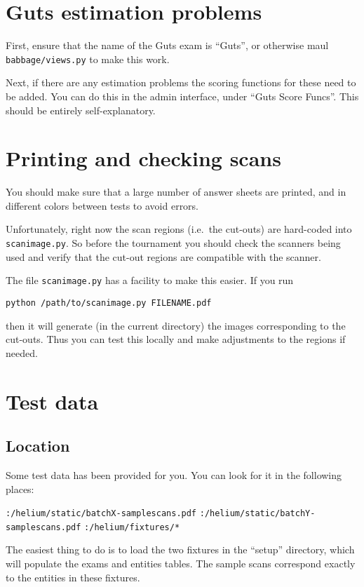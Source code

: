 \section{Guts estimation problems}
First, ensure that the name of the Guts exam is ``Guts'',
or otherwise maul \texttt{babbage/views.py} to make this work.

Next, if there are any estimation problems the scoring functions
for these need to be added.
You can do this in the admin interface, under ``Guts Score Funcs''.
This should be entirely self-explanatory.

\section{Printing and checking scans}
You should make sure that a large number of answer sheets are printed,
and in different colors between tests to avoid errors.

Unfortunately, right now the scan regions (i.e.\ the cut-outs)
are hard-coded into \verb+scanimage.py+.
So before the tournament you should check the scanners being used
and verify that the cut-out regions are compatible with the scanner.

The file \verb+scanimage.py+ has a facility to make this easier.
If you run
\begin{center}
\verb+python /path/to/scanimage.py FILENAME.pdf+
\end{center}
then it will generate (in the current directory)
the images corresponding to the cut-outs.
Thus you can test this locally and make adjustments to the regions if needed.

\section{Test data}
\subsection{Location}
Some test data has been provided for you.
You can look for it in the following places:
\begin{itemize}
	\ii \verb+:/helium/static/batchX-samplescans.pdf+
	\ii \verb+:/helium/static/batchY-samplescans.pdf+
	\ii \verb+:/helium/fixtures/*+
\end{itemize}
The easiest thing to do is to load the two fixtures in the ``setup'' directory,
which will populate the exams and entities tables.
The sample scans correspond exactly to the entities in these fixtures.

